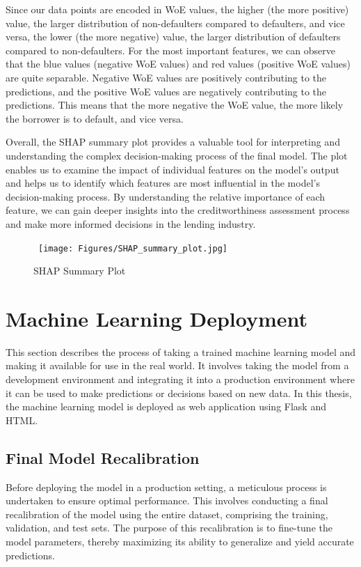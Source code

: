 Since our data points are encoded in WoE values, the higher (the more positive) value, the larger distribution of non-defaulters compared to defaulters, and vice versa, the lower (the more negative) value, the larger distribution of defaulters compared to non-defaulters.
For the most important features, we can observe that the blue values (negative WoE values) and red values (positive WoE values) are quite separable.
Negative WoE values are positively contributing to the predictions, and the positive WoE values are negatively contributing to the predictions. This means that the more negative the WoE value, the more likely the borrower is to default, and vice versa.

Overall, the SHAP summary plot provides a valuable tool for interpreting and understanding the complex decision-making process of the final model.
The plot enables us to examine the impact of individual features on the model's output and helps us to identify which features are most influential in the model's decision-making process.
By understanding the relative importance of each feature, we can gain deeper insights into the creditworthiness assessment process and make more informed decisions in the lending industry.

\begin{figure}[H]
\centering
\caption{SHAP Summary Plot}\vspace{0.5em}
\label{fig:shap}\
\texttt{[image: Figures/SHAP\_summary\_plot.jpg]}
\vspace{-1em}
\end{figure}

\section{Machine Learning Deployment}
This section describes the process of taking a trained machine learning model and making it available for use in the real world. It involves taking the model from a development environment and integrating it into a production environment where it can be used to make predictions or decisions based on new data. In this thesis, the machine learning model is deployed as web application using Flask and HTML.
\subsection{Final Model Recalibration}
Before deploying the model in a production setting, a meticulous process is undertaken to ensure optimal performance.
This involves conducting a final recalibration of the model using the entire dataset, comprising the training, validation, and test sets.
The purpose of this recalibration is to fine-tune the model parameters, thereby maximizing its ability to generalize and yield accurate predictions.

